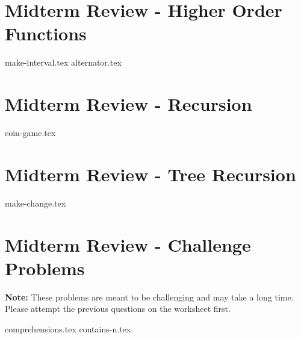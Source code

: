 \documentclass{exam}
\begin{document}
\newpage
\section{Midterm Review - Higher Order Functions}
\begin{questions}
{make-interval.tex}
{alternator.tex}
\end{questions}

\section{Midterm Review - Recursion}
\begin{questions}
{coin-game.tex}
\end{questions}

\section{Midterm Review - Tree Recursion}
\begin{questions}
{make-change.tex}
\end{questions}

\newpage
\section{Midterm Review - Challenge Problems}
\textbf{Note:} These problems are meant to be challenging and may take a long time. Please attempt the previous questions on the worksheet first.
\begin{questions}
{comprehensions.tex}
\newpage
{contains-n.tex}
\end{questions}
\end{document}
